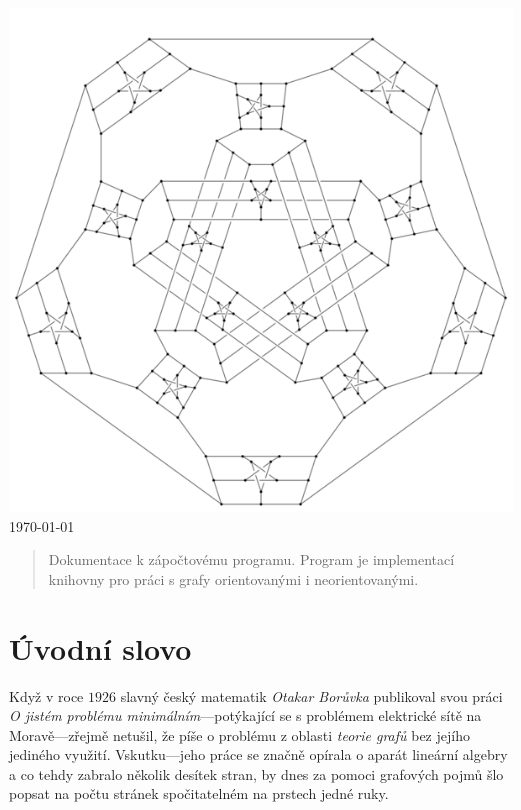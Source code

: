 \documentclass[11pt,a4paper]{article}
\begin{document}
\begin{titlepage}
\begin{center}
\vfill
\includegraphics[viewport=455 50 150 100,scale=0.4]{./Descartes_snark.png}\\[1cm]    

{\large \today}

\end{center}

\end{titlepage}


\begin{abstract}
Dokumentace k zápočtovému programu.
Program je implementací knihovny pro práci s grafy orientovanými i
neorientovanými.
\end{abstract}

\pagebreak

\tableofcontents

\pagebreak

\part{Úvodní slovo}
Když v roce $1926$ slavný český matematik {\sl Otakar Borůvka\/} publikoval
  svou práci {\sl O jistém problému minimálním\/}---potýkající se s problémem
  elektrické sítě na Moravě---zřejmě netušil, že píše o problému z oblasti {\sl
  teorie grafů\/} bez jejího jediného využití.
Vskutku---jeho práce se značně opírala o aparát lineární algebry a co tehdy
  zabralo několik desítek stran, by dnes za pomoci grafových pojmů šlo popsat
  na počtu stránek spočitatelném na prstech jedné ruky.
\end{document}
